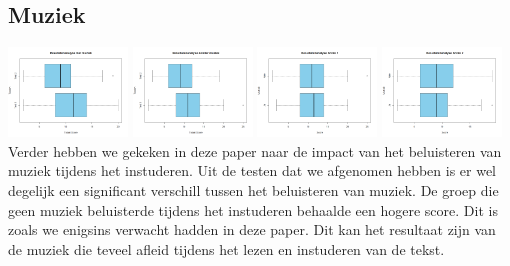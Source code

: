 \documentclass{hogent-article}
\begin{document}
	\subsection{Muziek}
	\includegraphics[width=120px]{Rplot_MetMuziek}	
	\includegraphics[width=120px]{Rplot_ZonderMuziek}
	\includegraphics[width=120px]{Rplot_Muziek_Score1}
	\includegraphics[width=120px]{Rplot_Muziek_Score2}
	Verder hebben we gekeken in deze paper naar de impact van het beluisteren van muziek tijdens het instuderen. Uit de testen dat we afgenomen hebben is er wel degelijk een significant verschill tussen het beluisteren van muziek. De groep die geen muziek beluisterde tijdens het instuderen behaalde een hogere score. Dit is zoals we enigsins verwacht hadden in deze paper. Dit kan het resultaat zijn van de muziek die teveel afleid tijdens het lezen en instuderen van de tekst.
	
\end{document}
